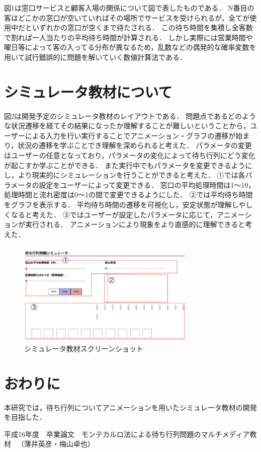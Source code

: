 \documentclass[twocolumn,10pt,a4j]{ltjsarticle}
\begin{document}
図1は窓口サービスと顧客入場の関係について図で表したものである．
N番目の客はどこかの窓口が空いていればその場所でサービスを受けられるが，全てが使用中だといずれかの窓口が空くまで待たされる．
この待ち時間を集積し全客数で割れば一人当たりの平均待ち時間が計算される．
しかし実際には営業時間や曜日等によって客の入ってる分布が異なるため，乱数などの偶発的な確率変数を用いて試行錯誤的に問題を解いていく数値計算法である．


\section{シミュレータ教材について}
図2は開発予定のシミュレータ教材のレイアウトである．
問題点であるどのような状況遷移を経てその結果になったか理解することが難しいということから，ユーザーによる入力を行い実行することでアニメーション・グラフの遷移が始まり，状況の遷移を学ぶことでき理解を深められると考えた．
パラメータの変更はユーザーの任意となっており，パラメータの変化によって待ち行列にどう変化が起こすか学ぶことができる．
また実行中でもパラメータを変更できるようにし，より現実的にシミュレーションを行うことができると考えた．
①では各パラメータの設定をユーザーによって変更できる．
窓口の平均処理時間は1〜10，処理時間と流れ密度は0〜1の間で変更できるようにした．
②では平均待ち時間をグラフを表示する．
平均待ち時間の遷移を可視化し，安定状態が理解しやしくなると考えた．
③ではユーザーが設定したパラメータに応じて，アニメーションが実行される．
アニメーションにより現象をより直感的に理解できると考えた．

\begin{figure}[h]
\begin{center}
\includegraphics[clip,width=85mm,height=50mm]{figures/layout.pdf}
\end{center}
\caption{シミュレータ教材スクリーンショット}
\label{fig:教科書}
\end{figure}

\section{おわりに}
本研究では，待ち行列についてアニメーションを用いたシミュレータ教材の開発を目指した．

\begin{thebibliography}{99}
平成16年度　卒業論文　モンテカルロ法による待ち行列問題のマルチメディア教材 　（薄井英彦・梅山卓也）
\end{thebibliography}
\end{document}
